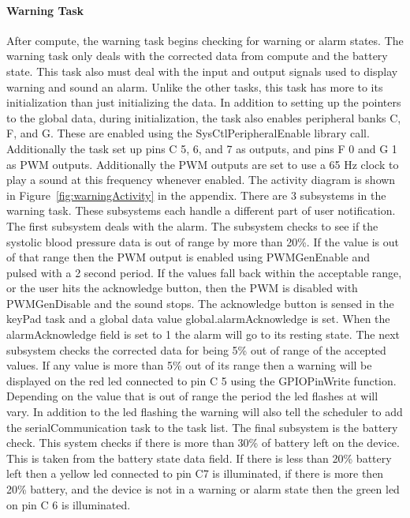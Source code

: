 \documentclass[12pt]{article} %
\begin{document}
    \paragraph{Warning Task}
    After compute, the warning task begins checking for warning or alarm states. The
    warning task only deals with the corrected data from compute and the battery
    state. This task also must deal with the input and output signals used to
    display warning and sound an alarm. Unlike the other tasks, this task has more
    to its initialization than just initializing the data. In addition to setting
    up the pointers to the global data, during initialization, the task also
    enables peripheral banks C, F, and G. These are enabled using the
    SysCtlPeripheralEnable library call. Additionally the task set up pins C 5, 6,
    and 7 as outputs, and pins F 0 and G 1 as PWM outputs. Additionally the PWM outputs are set to use a 65 Hz clock to play
    a sound at this frequency whenever enabled. The activity diagram is shown in
    Figure~\ref{fig:warningActivity} in the appendix. There are 3 subsystems in the
    warning task. These subsystems each handle a different part of user
    notification. The first subsystem deals with the alarm. The subsystem checks to
    see if the systolic blood pressure data is out of range by more than 20\%. If the value is out of that range then the PWM output is enabled
    using PWMGenEnable and pulsed with a 2 second period. If the values fall back within the acceptable range, or the
    user hits the acknowledge button, then the PWM is disabled with PWMGenDisable
    and the sound stops. The acknowledge button is sensed in the keyPad task and a global data value global.alarmAcknowledge is set. When the alarmAcknowledge field is set to 1 the alarm will go to its resting state. The next subsystem checks the corrected data for being 5\%
    out of range of the accepted values. If any value is more than 5\% out of its
    range then a warning will be displayed on the red led connected to pin C 5
    using the GPIOPinWrite function. Depending on the value that is out of range
    the period the led flashes at will vary. In addition to the led flashing the warning will also tell the scheduler to add the serialCommunication task to the task list. The final subsystem is the battery
    check. This system checks if there is more than 30\% of battery left on the
    device. This is taken from the battery state data field. If there is less than
    20\% battery left then a yellow led connected to pin C7 is illuminated, if
    there is more then 20\% battery, and the device is not in a warning or alarm
    state then the green led on pin C 6 is illuminated. 
    
\end{document}
